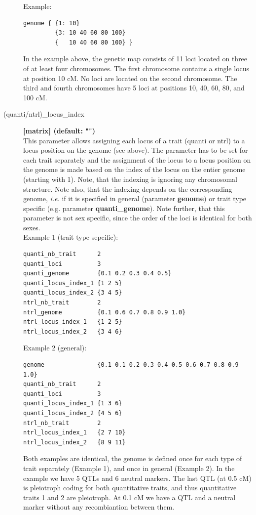 \documentclass[letterpaper,12pt,oneside]{book}
\begin{document}
\begin{description}
Example:
\begin{lstlisting}[frame=single]
genome { {1: 10}
         {3: 10 40 60 80 100}
         {   10 40 60 80 100} }
\end{lstlisting} 
In the example above, the genetic map consists of 11 loci located on three of at least four
chromosomes. The first chromosome contains a single locus at position 10 cM. No loci are located on
the second chromosome. The third and fourth chromosomes have 5 loci at positions 10, 40, 60, 80, and 100 cM.


\item[(quanti/ntrl)\_locus\_index\index{quanti\_locus\_index}\index{ntrl\_locus\_index}]\textbf{[matrix]
(default: "")}\\
This parameter allows assigning each locus of a trait (quanti or ntrl) to a locus position on the genome (see above). The parameter has to be set for each trait
separately and the assignment of the locus to a locus position on the genome is made based on the
index of the locus on the entier genome (starting with 1). Note, that the indexing is ignoring any
chromosomal structure. Note also, that the indexing depends on the corresponding genome, \textit{i.e.} if it
is specified in general (parameter \textbf{genome}) or trait type specific (e.g. parameter
\textbf{quanti\_genome}). Note further, that this parameter is not sex specific, since the
order of the loci is identical for both sexes.   \\

Example 1 (trait type sepcific):
\begin{lstlisting}[frame=single]
quanti_nb_trait      2
quanti_loci          3
quanti_genome        {0.1 0.2 0.3 0.4 0.5}
quanti_locus_index_1 {1 2 5}
quanti_locus_index_2 {3 4 5}
ntrl_nb_trait        2
ntrl_genome          {0.1 0.6 0.7 0.8 0.9 1.0}
ntrl_locus_index_1   {1 2 5}
ntrl_locus_index_2   {3 4 6}
\end{lstlisting} 

Example 2 (general):
\begin{lstlisting}[frame=single]
genome               {0.1 0.1 0.2 0.3 0.4 0.5 0.6 0.7 0.8 0.9 1.0}
quanti_nb_trait      2
quanti_loci          3
quanti_locus_index_1 {1 3 6}
quanti_locus_index_2 {4 5 6}
ntrl_nb_trait        2
ntrl_locus_index_1   {2 7 10}
ntrl_locus_index_2   {8 9 11}
\end{lstlisting} 

Both examples are identical, the genome is defined once for each type of trait separately (Example
1), and once in general (Example 2). In the example we have 5 QTLs and 6 neutral markers. The
last QTL (at 0.5 cM) is pleiotroph coding for both quantitative traits, and thus quantitative
traits 1 and 2 are pleiotroph.
At 0.1 cM we have a QTL and a neutral marker without any recombiantion between them.


\end{description}
\end{document}

